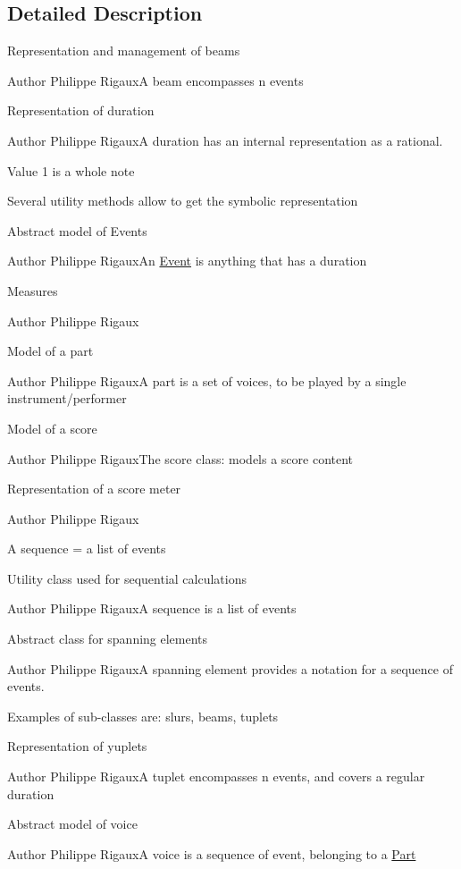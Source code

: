 \subsection{Detailed Description}
Representation and management of beams

\begin{DoxyAuthor}{Author}
Philippe RigauxA beam encompasses n events
\end{DoxyAuthor}
Representation of duration

\begin{DoxyAuthor}{Author}
Philippe RigauxA duration has an internal representation as a rational.
\end{DoxyAuthor}
Value 1 is a whole note

Several utility methods allow to get the symbolic representation

Abstract model of Events

\begin{DoxyAuthor}{Author}
Philippe Rigaux\+An \mbox{\hyperlink{classScoreModel_1_1Event}{Event}} is anything that has a duration
\end{DoxyAuthor}
Measures

\begin{DoxyAuthor}{Author}
Philippe Rigaux
\end{DoxyAuthor}
Model of a part

\begin{DoxyAuthor}{Author}
Philippe RigauxA part is a set of voices, to be played by a single instrument/performer
\end{DoxyAuthor}
Model of a score

\begin{DoxyAuthor}{Author}
Philippe Rigaux\+The score class\+: models a score content
\end{DoxyAuthor}
Representation of a score meter

\begin{DoxyAuthor}{Author}
Philippe Rigaux
\end{DoxyAuthor}
A sequence = a list of events

Utility class used for sequential calculations

\begin{DoxyAuthor}{Author}
Philippe RigauxA sequence is a list of events
\end{DoxyAuthor}
Abstract class for spanning elements

\begin{DoxyAuthor}{Author}
Philippe RigauxA spanning element provides a notation for a sequence of events.
\end{DoxyAuthor}
Examples of sub-\/classes are\+: slurs, beams, tuplets

Representation of yuplets

\begin{DoxyAuthor}{Author}
Philippe RigauxA tuplet encompasses n events, and covers a regular duration
\end{DoxyAuthor}
Abstract model of voice

\begin{DoxyAuthor}{Author}
Philippe RigauxA voice is a sequence of event, belonging to a \mbox{\hyperlink{classScoreModel_1_1Part}{Part}} 
\end{DoxyAuthor}
